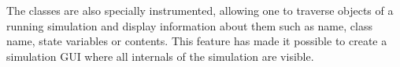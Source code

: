 The classes are also specially instrumented, allowing one
to traverse objects of a running simulation and display information
about them such as name, class name, state variables or contents.
This feature has made it possible to create a simulation GUI where
all internals of the simulation are visible.


%
%
%
%
%
%
%
%
